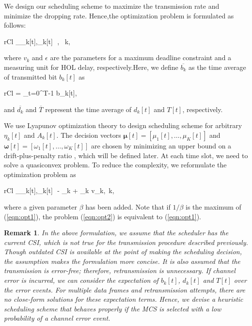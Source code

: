 \documentclass[conference]{IEEEtran}
\newcommand{\mat}[1]{{\mathbf{#1}}}
\newcommand{\beqna}{\begin{IEEEeqnarray}{rCl}}
\newcommand{\eeqna}{\end{IEEEeqnarray}}
\newcommand{\0}{\vect{0}}
\newcommand{\1}{\vect{1}}
\newcommand{\eref}[1]{(\ref{#1})}
\newcommand{\bmu}{\mat{\boldsymbol{\mu}}}
\newcommand{\bomega}{\mat{\boldsymbol{\omega}}}
\newtheorem{rem}{Remark}
\begin{document}
We design our scheduling scheme to maximize the transmission rate and minimize the dropping rate. Hence,the optimization problem is formulated as follows:
\beqna
\max_{\mu_k[t],\omega_k[t]}\,\, , ~\forall k,\label{eqn:opt1}
\eeqna
where $v_k$ and $\epsilon$ are the parameters for a maximum deadline constraint and a measuring unit for HOL delay, respectively.Here, we define $\overline{b_k}$ as the  time average of transmitted bit $b_k[t]$ as
\beqna
{} =  \sum_{t=0}^{T-1} b_k[t],
\eeqna
and $\overline{d_k}$ and $\overline{T}$ represent the time average of $d_k[t]$ and $T[t]$, respectively.


We use Lyapunov optimization theory \cite{Nee10BK,Nee10Arx} to design scheduling scheme for arbitrary $\eta_k[t]$ and $A_k[t]$. The decision vectors $\bmu [t] = [\mu_1[t],\dots,\mu_K[t]]$  and $\bomega[t] = [\omega_1[t],\dots,\omega_K[t]]$ are chosen by minimizing an upper bound on a drift-plus-penalty ratio \cite{Nee10Arx}, which will be defined later. At each time slot, we need to solve a quasiconvex problem. To reduce the complexity, we reformulate the optimization problem as
\beqna
\min_{\mu_k[t],\omega_k[t]}\,\, \epsilon {} - \beta  \sum_k 
+ \beta  \sum_k v_k,~\forall k,  \label{eqn:opt2}
\eeqna
where a given parameter $\beta$ has been added. Note that if $1/\beta$ is the maximum of \eref{eqn:opt1}, the problem \eref{eqn:opt2} is equivalent to \eref{eqn:opt1}.
\begin{rem}
In the above formulation, we assume that the scheduler has the current CSI, which is not true for the transmission procedure described previously. Though outdated CSI is available at the point of making the scheduling decision, the assumption makes the formulation more concise. It is also assumed that the transmission is error-free; therefore, retransmission is unnecessary. If channel error is incurred, we can consider the expectation of $b_k[t]$, $d_k[t]$ and $T[t]$ over the error events. For multiple data frames  and retransmission attempts, there are no close-form solutions for these expectation terms. Hence, we devise a heuristic scheduling scheme that behaves properly if the MCS is selected with a low probability of a channel error event.
\end{rem}
\end{document}

